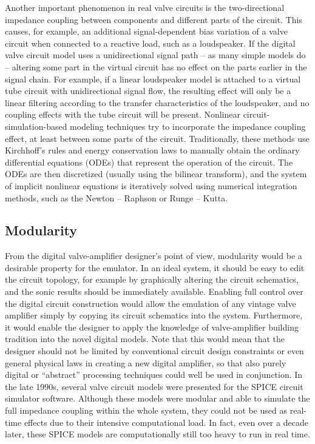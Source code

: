 \documentclass[10pt,a4paper,oneside]{article}
\begin{document}
Another important phenomenon in real valve circuits is the two-directional impedance coupling between components and different parts of the circuit. This causes, for example, an additional signal-dependent bias variation of a valve circuit when connected to a reactive load, such as a loudspeaker. If the digital valve circuit model uses a unidirectional signal path – as many simple models do – altering some part in the virtual circuit has no effect on the parts earlier in the signal chain. For example, if a linear loudspeaker model is attached to a virtual tube circuit with unidirectional signal flow, the resulting effect will only be a linear filtering according to the transfer characteristics of the loudspeaker, and no coupling effects with the tube circuit will be present. Nonlinear circuit-simulation-based modeling techniques try to incorporate the impedance coupling effect, at least between some parts of the circuit. Traditionally, these methods use Kirchhoff’s rules and energy conservation laws to manually obtain the ordinary differential equations (ODEs) that represent the operation of the circuit. The ODEs are then discretized (usually using the bilinear transform), and the system of implicit nonlinear equations is iteratively solved using numerical integration methods, such as the Newton – Raphson or Runge – Kutta.
\subsection{Modularity}
From the digital valve-amplifier designer’s point of view, modularity would be a desirable property for the emulator. In an ideal system, it should be easy to edit the circuit topology, for example by graphically altering the circuit schematics, and the sonic results should be immediately available. Enabling full control over the digital circuit construction would allow the emulation of any vintage valve amplifier simply by copying its circuit schematics into the system. Furthermore, it would enable the designer to apply the knowledge of valve-amplifier building tradition into the novel digital models. Note that this would mean that the designer should not be limited by conventional circuit design constraints or even general physical laws in creating a new digital amplifier, so that also purely digital or “abstract” processing techniques could well be used in conjunction. In the late 1990s, several valve circuit models were presented for the SPICE circuit simulator software. Although these models were modular and able to simulate the full impedance coupling within the whole system, they could not be used as real-time effects due to their intensive computational load. In fact, even over a decade later, these SPICE models are computationally still too heavy to run in real time.
\end{document}
